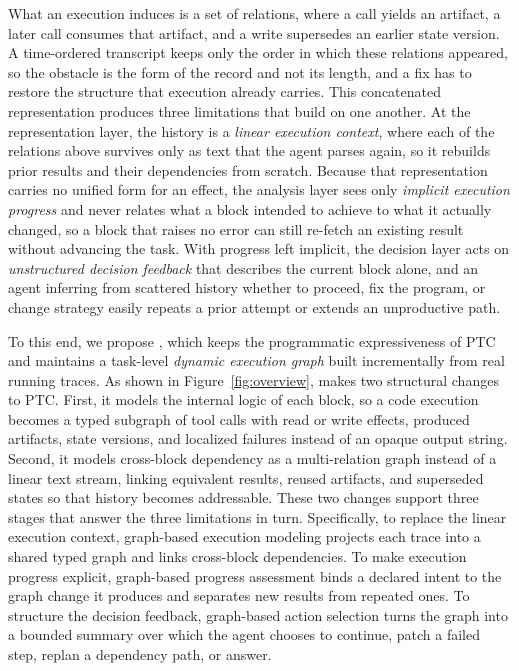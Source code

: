 What an execution induces is a set of relations, where a call yields an artifact, a later call consumes that artifact, and a write supersedes an earlier state version.
A time-ordered transcript keeps only the order in which these relations appeared, so the obstacle is the form of the record and not its length, and a fix has to restore the structure that execution already carries.
This concatenated representation produces three limitations that build on one another.
\label{sec:intro-limit}
At the representation layer, the history is a \emph{linear execution context}, where each of the relations above survives only as text that the agent parses again, so it rebuilds prior results and their dependencies from scratch.
Because that representation carries no unified form for an effect, the analysis layer sees only \emph{implicit execution progress} and never relates what a block intended to achieve to what it actually changed, so a block that raises no error can still re-fetch an existing result without advancing the task.
With progress left implicit, the decision layer acts on \emph{unstructured decision feedback} that describes the current block alone, and an agent inferring from scattered history whether to proceed, fix the program, or change strategy easily repeats a prior attempt or extends an unproductive path.

To this end, we propose \method, which keeps the programmatic expressiveness of PTC and maintains a task-level \emph{dynamic execution graph} built incrementally from real running traces.
As shown in Figure~\ref{fig:overview}, \method makes two structural changes to PTC.
First, it models the internal logic of each block, so a code execution becomes a typed subgraph of tool calls with read or write effects, produced artifacts, state versions, and localized failures instead of an opaque output string.
Second, it models cross-block dependency as a multi-relation graph instead of a linear text stream, linking equivalent results, reused artifacts, and superseded states so that history becomes addressable.
These two changes support three stages that answer the three limitations in turn.
Specifically, to replace the linear execution context, graph-based execution modeling projects each trace into a shared typed graph and links cross-block dependencies.
To make execution progress explicit, graph-based progress assessment binds a declared intent to the graph change it produces and separates new results from repeated ones.
To structure the decision feedback, graph-based action selection turns the graph into a bounded summary over which the agent chooses to continue, patch a failed step, replan a dependency path, or answer.

